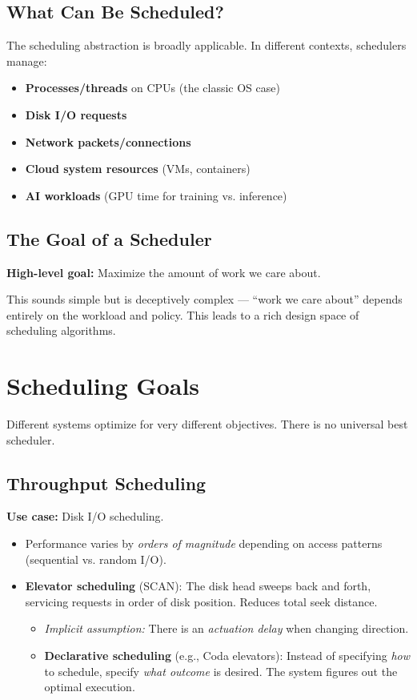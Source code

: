 \documentclass[11pt]{article}
\begin{document}
\subsection{What Can Be Scheduled?}

The scheduling abstraction is broadly applicable. In different contexts, schedulers manage:
\begin{itemize}
    \item \textbf{Processes/threads} on CPUs (the classic OS case)
    \item \textbf{Disk I/O requests}
    \item \textbf{Network packets/connections}
    \item \textbf{Cloud system resources} (VMs, containers)
    \item \textbf{AI workloads} (GPU time for training vs. inference)
\end{itemize}

\subsection{The Goal of a Scheduler}

\textbf{High-level goal:} Maximize the amount of work we care about.

This sounds simple but is deceptively complex --- ``work we care about'' depends entirely on the workload and policy. This leads to a rich design space of scheduling algorithms.

\section{Scheduling Goals}

Different systems optimize for very different objectives. There is no universal best scheduler.

\subsection{Throughput Scheduling}

\textbf{Use case:} Disk I/O scheduling.

\begin{itemize}
    \item Performance varies by \emph{orders of magnitude} depending on access patterns (sequential vs. random I/O).
    \item \textbf{Elevator scheduling} (SCAN): The disk head sweeps back and forth, servicing requests in order of disk position. Reduces total seek distance.
    \begin{itemize}
        \item \emph{Implicit assumption:} There is an \emph{actuation delay} when changing direction.
        \item \textbf{Declarative scheduling} (e.g., Coda elevators): Instead of specifying \emph{how} to schedule, specify \emph{what outcome} is desired. The system figures out the optimal execution.
    \end{itemize}
\end{itemize}
\end{document}
